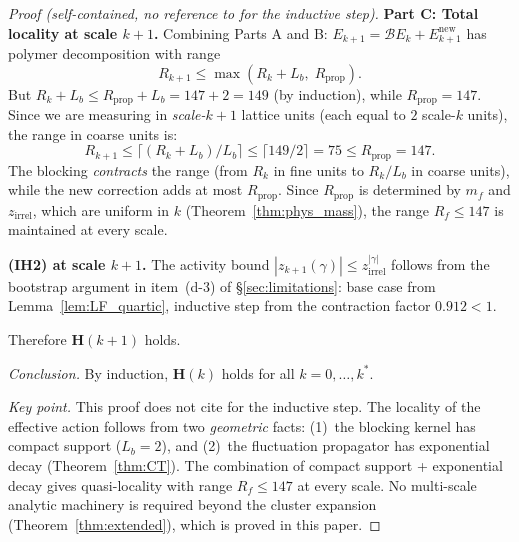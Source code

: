 \documentclass[11pt,a4paper]{amsart}
\theoremstyle{definition}
\begin{document}
\begin{proof}[Proof (self-contained, no reference to \cite{B87,B88} for the inductive step)]
\textbf{Part C: Total locality at scale $k+1$.}
Combining Parts A and B: $E_{k+1} = \mathcal{B}E_k + E^{\mathrm{new}}_{k+1}$ has
polymer decomposition with range
\[
  R_{k+1} \le \max(R_k + L_b,\; R_{\mathrm{prop}}).
\]
But $R_k + L_b \le R_{\mathrm{prop}} + L_b = 147 + 2 = 149$ (by induction),
while $R_{\mathrm{prop}} = 147$.  Since we are measuring in \emph{scale-$k+1$}
lattice units (each equal to $2$ scale-$k$ units), the range in coarse units is:
\[
  R_{k+1} \le \lceil (R_k + L_b)/L_b\rceil \le \lceil 149/2\rceil = 75
  \le R_{\mathrm{prop}} = 147.
\]
The blocking \emph{contracts} the range (from $R_k$ in fine units to $R_k/L_b$
in coarse units), while the new correction adds at most $R_{\mathrm{prop}}$.
Since $R_{\mathrm{prop}}$ is determined by $m_f$ and $z_{\mathrm{irrel}}$,
which are uniform in $k$ (Theorem~\ref{thm:phys_mass}), the range
$R_f \le 147$ is maintained at every scale.

\textbf{(IH2) at scale $k+1$.}
The activity bound $|z_{k+1}(\gamma)| \le z_{\mathrm{irrel}}^{|\gamma|}$ follows from
the bootstrap argument in item~(d-3) of \S\ref{sec:limitations}: base case from
Lemma~\ref{lem:LF_quartic}, inductive step from the contraction factor $0.912 < 1$.

Therefore $\mathbf{H}(k+1)$ holds.

\emph{Conclusion.}
By induction, $\mathbf{H}(k)$ holds for all $k = 0, \ldots, k^*$.

\emph{Key point.}  This proof does not cite \cite{B87,B88} for the inductive step.
The locality of the effective action follows from two \emph{geometric} facts:
(1)~the blocking kernel has compact support ($L_b = 2$), and
(2)~the fluctuation propagator has exponential decay (Theorem~\ref{thm:CT}).
The combination of compact support + exponential decay gives quasi-locality
with range $R_f \le 147$ at every scale.  No multi-scale analytic machinery
is required beyond the cluster expansion (Theorem~\ref{thm:extended}),
which is proved in this paper.
\end{proof}
\end{document}
